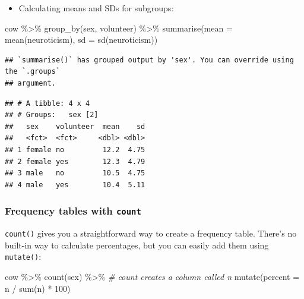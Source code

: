 \documentclass[
]{book}
\newenvironment{Shaded}{\begin{snugshade}}{\end{snugshade}}
\newcommand{\AttributeTok}[1]{\textcolor[rgb]{0.77,0.63,0.00}{#1}}
\newcommand{\CommentTok}[1]{\textcolor[rgb]{0.56,0.35,0.01}{\textit{#1}}}
\newcommand{\DecValTok}[1]{\textcolor[rgb]{0.00,0.00,0.81}{#1}}
\newcommand{\FunctionTok}[1]{\textcolor[rgb]{0.00,0.00,0.00}{#1}}
\newcommand{\NormalTok}[1]{#1}
\newcommand{\SpecialCharTok}[1]{\textcolor[rgb]{0.00,0.00,0.00}{#1}}
\providecommand{\tightlist}{%
  \setlength{\itemsep}{0pt}\setlength{\parskip}{0pt}}
\begin{document}
\begin{itemize}
\tightlist
\item
  Calculating means and SDs for subgroups:
\end{itemize}

\begin{Shaded}
\begin{Highlighting}[]
\NormalTok{cow }\SpecialCharTok{\%\textgreater{}\%}
    \FunctionTok{group\_by}\NormalTok{(sex, volunteer) }\SpecialCharTok{\%\textgreater{}\%}
    \FunctionTok{summarise}\NormalTok{(}\AttributeTok{mean =} \FunctionTok{mean}\NormalTok{(neuroticism),}
              \AttributeTok{sd =} \FunctionTok{sd}\NormalTok{(neuroticism))}
\end{Highlighting}
\end{Shaded}

\begin{verbatim}
## `summarise()` has grouped output by 'sex'. You can override using the `.groups`
## argument.
\end{verbatim}

\begin{verbatim}
## # A tibble: 4 x 4
## # Groups:   sex [2]
##   sex    volunteer  mean    sd
##   <fct>  <fct>     <dbl> <dbl>
## 1 female no         12.2  4.75
## 2 female yes        12.3  4.79
## 3 male   no         10.5  4.75
## 4 male   yes        10.4  5.11
\end{verbatim}

\hypertarget{frequency-tables-with-count}{%
\subsubsection*{\texorpdfstring{Frequency tables with \texttt{count}}{Frequency tables with count}}\label{frequency-tables-with-count}}

\texttt{count()} gives you a straightforward way to create a frequency table. There's
no built-in way to calculate percentages, but you can easily add them
using \texttt{mutate()}:

\begin{Shaded}
\begin{Highlighting}[]
\NormalTok{cow }\SpecialCharTok{\%\textgreater{}\%}
    \FunctionTok{count}\NormalTok{(sex) }\SpecialCharTok{\%\textgreater{}\%}
    \CommentTok{\# count creates a column called \textquotesingle{}n\textquotesingle{}}
    \FunctionTok{mutate}\NormalTok{(}\AttributeTok{percent =}\NormalTok{ n }\SpecialCharTok{/} \FunctionTok{sum}\NormalTok{(n) }\SpecialCharTok{*} \DecValTok{100}\NormalTok{)}
\end{Highlighting}
\end{Shaded}
\end{document}

